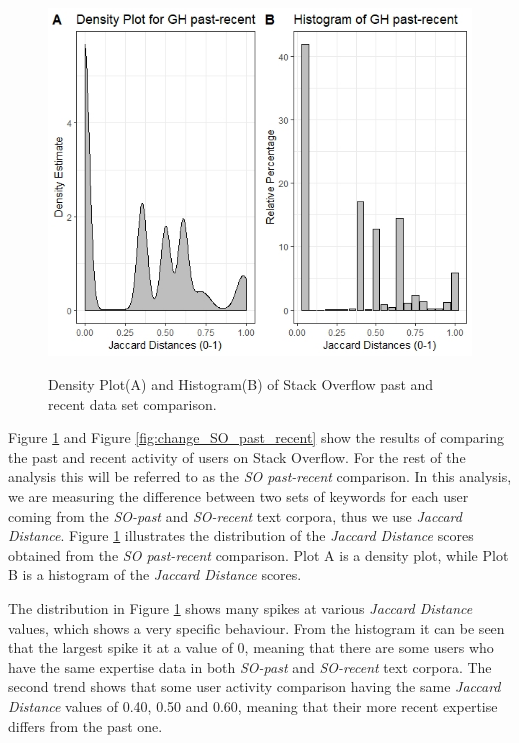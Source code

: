         \begin{figure}
          \centering
          \includegraphics[width=\textwidth]{figures/SO_past-recent.jpeg}\\
          \caption{Density Plot(A) and Histogram(B) of Stack Overflow past and recent data set comparison.}
          \label{fig:SO_past_recent}
        \end{figure}
        
        Figure \ref{fig:SO_past_recent} and Figure \ref{fig:change_SO_past_recent} show the results of comparing the past and recent activity of users on Stack Overflow. For the rest of the analysis this will be referred to as the \emph{SO past-recent} comparison. In this analysis, we are measuring the difference between two sets of keywords for each user coming from the \emph{SO-past} and \emph{SO-recent} text corpora, thus we use \emph{Jaccard Distance}. Figure \ref{fig:SO_past_recent} illustrates the distribution of the \emph{Jaccard Distance} scores obtained from the \emph{SO past-recent} comparison. Plot A is a density plot, while Plot B is a histogram of the \emph{Jaccard Distance} scores. 
         
        The distribution in Figure \ref{fig:SO_past_recent} shows many spikes at various \emph{Jaccard Distance} values, which shows a very specific behaviour. From the histogram it can be seen that the largest spike it at a value of 0, meaning that there are some users who have the same expertise data in both \emph{SO-past} and \emph{SO-recent} text corpora. The second trend shows that some user activity comparison having the same \emph{Jaccard Distance} values of 0.40, 0.50 and 0.60, meaning that their more recent expertise differs from the past one.
        
